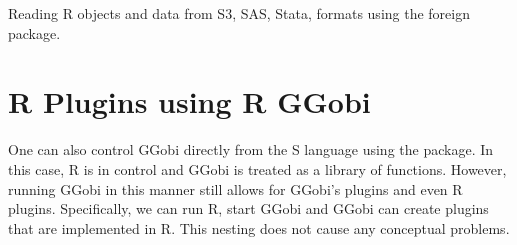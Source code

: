 \documentclass{article}
\begin{document}
Reading R objects and data from S3, SAS, Stata, formats using 
the foreign package.


\section{R Plugins using R GGobi}
One can also control GGobi directly from the S language using the
 package.  In this case, R is in control and GGobi is
treated as a library of functions.  However, running GGobi in this
manner still allows for GGobi's plugins and even R plugins.
Specifically, we can run R, start GGobi and GGobi can create plugins
that are implemented in R.  This nesting does not cause any conceptual
problems.
\end{document}

